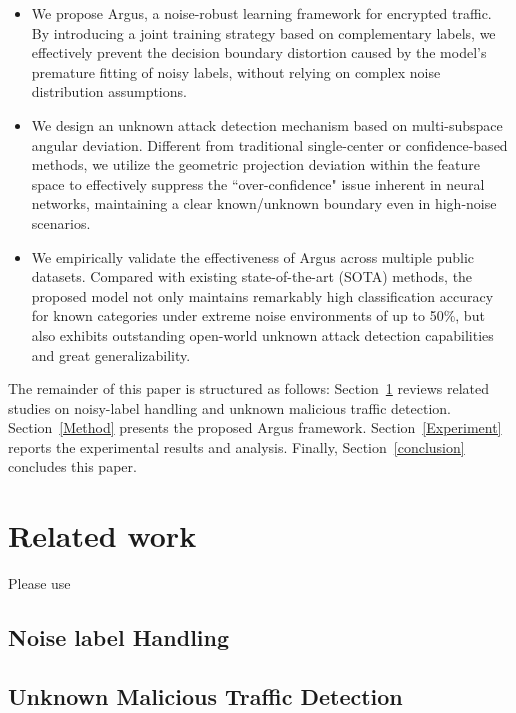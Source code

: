 \documentclass{SCIS2026}
\begin{document}
\begin{itemize}
	\item We propose Argus, a noise-robust learning framework for encrypted traffic. By introducing a joint training strategy based on complementary labels, we effectively prevent the decision boundary distortion caused by the model's premature fitting of noisy labels, without relying on complex noise distribution assumptions.
	
	\item We design an unknown attack detection mechanism based on multi-subspace angular deviation. Different from traditional single-center or confidence-based methods, we utilize the geometric projection deviation within the feature space to effectively suppress the ``over-confidence" issue inherent in neural networks, maintaining a clear known/unknown boundary even in high-noise scenarios.
	
	\item We empirically validate the effectiveness of Argus across multiple public datasets. Compared with existing state-of-the-art (SOTA) methods, the proposed model not only maintains remarkably high classification accuracy for known categories under extreme noise environments of up to 50\%, but also exhibits outstanding open-world unknown attack detection capabilities and great generalizability.
	
\end{itemize}

The remainder of this paper is structured as follows: 
Section~\ref{Related_work} reviews related studies on noisy-label handling and unknown malicious traffic detection. 
Section~\ref{Method} presents the proposed Argus framework. 
Section~\ref{Experiment} reports the experimental results and analysis. 
Finally, Section~\ref{conclusion} concludes this paper.



\section{Related work}\label{Related_work}

Please use 
\subsection{Noise label Handling}

\cite{FlowRefiner}
\cite{BAPTISM}


\subsection{Unknown Malicious Traffic Detection}
\cite{8_HyperVision}
\end{document}

